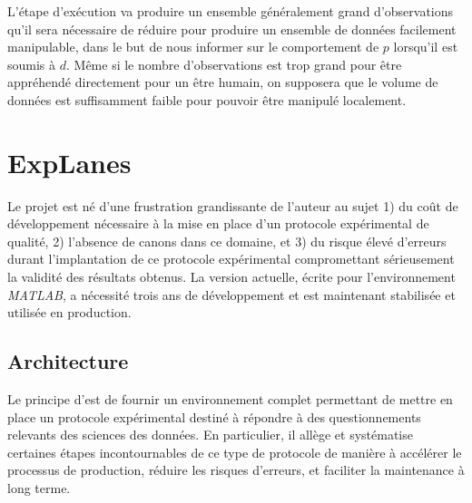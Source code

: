 L'étape d'exécution va produire un ensemble généralement grand d'observations qu'il sera nécessaire de réduire pour produire un ensemble de données facilement manipulable, dans le but de nous informer sur le comportement de $p$ lorsqu'il est soumis à $d$. Même si le nombre d'observations est trop grand pour être appréhendé directement pour un être humain, on supposera que le volume de données est suffisamment faible pour pouvoir être manipulé localement.


\section{\nmu ExpLanes} \label{sec:explanes}

Le projet \explanes {} est né d'une frustration grandissante de l'auteur au sujet 1) du coût de développement nécessaire à la mise en place d'un protocole expérimental de qualité, 2) l'absence de canons dans ce domaine, et 3) du risque élevé d'erreurs durant l'implantation de ce protocole expérimental compromettant sérieusement la validité des résultats obtenus. La version actuelle, écrite pour l'environnement \textit{MATLAB}\textsuperscript{\tiny\textregistered}, a nécessité trois ans de développement et est maintenant stabilisée et utilisée en production.

\subsection{Architecture}


Le principe d'\explanes est de fournir un environnement complet permettant de mettre en place un protocole expérimental destiné à répondre à des questionnements relevants des sciences des données. En particulier, il allège et systématise certaines étapes incontournables de ce type de protocole de manière à accélérer le processus de production, réduire les risques d'erreurs, et faciliter la maintenance à long terme.

